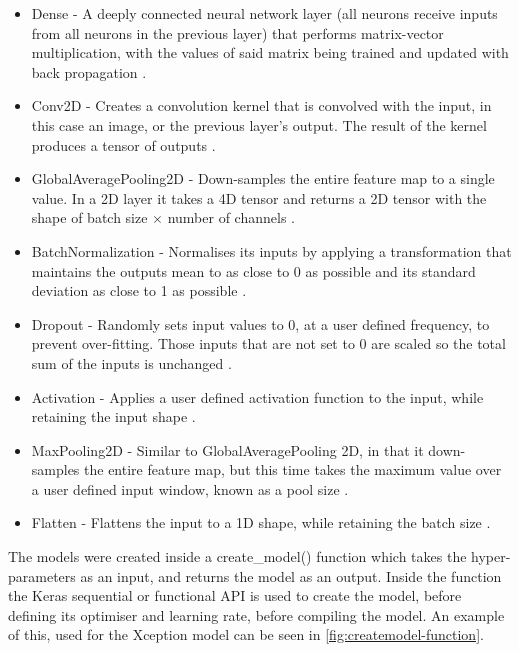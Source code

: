 \begin{itemize}
    \item Dense -  A deeply connected neural network layer (all neurons receive inputs from all neurons in the previous layer) that performs matrix-vector multiplication, with the values of said matrix being trained and updated with back propagation \citep{Denselay11:online}.
    \item Conv2D - Creates a convolution kernel that is convolved with the input, in this case an image, or the previous layer's output. The result of the kernel produces a tensor of outputs \citep{Conv2Dla69:online}.
    \item GlobalAveragePooling2D - Down-samples the entire feature map to a single value. In a 2D layer it takes a 4D tensor and returns a 2D tensor with the shape of batch size $\times$ number of channels \citep{GlobalAv91:online}.
    \item BatchNormalization - Normalises its inputs by applying a transformation that maintains the outputs mean to as close to 0 as possible and its standard deviation as close to 1 as possible \citep{BatchNor52:online}.
    \item Dropout - Randomly sets input values to 0, at a user defined frequency, to prevent over-fitting. Those inputs that are not set to 0 are scaled so the total sum of the inputs is unchanged \citep{Dropoutl66:online}.
    \item Activation - Applies a user defined activation function to the input, while retaining the input shape \citep{Activati33:online}.
    \item MaxPooling2D - Similar to GlobalAveragePooling 2D, in that it down-samples the entire feature map, but this time takes the maximum value over a user defined input window, known as a pool size \citep{MaxPooli1:online}.
    \item Flatten - Flattens the input to a 1D shape, while retaining the batch size \citep{Flattenl52:online}.
\end{itemize}

The models were created inside a create\_model() function which takes the hyper-parameters as an input, and returns the model as an output. Inside the function the Keras sequential or functional API is used to create the model, before defining its optimiser and learning rate, before compiling the model. An example of this, used for the Xception model can be seen in \autoref{fig:createmodel-function}.


